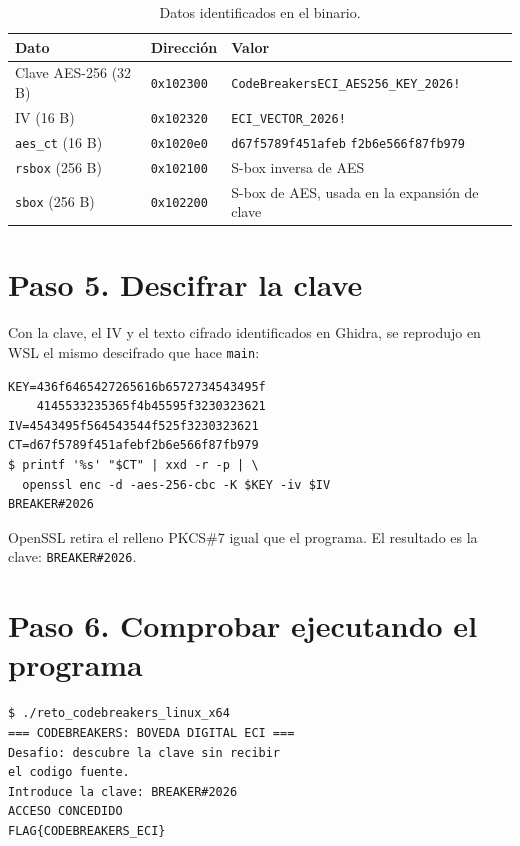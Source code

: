 \documentclass[journal]{IEEEtran}
\begin{document}
\begin{table}[H]
\centering
\caption{Datos identificados en el binario.}
\footnotesize
\begin{tabular}{@{}p{0.85in} l p{1.45in}@{}}
\hline
Dato & Direcci\'on & Valor \\ \hline
Clave AES-256 (32 B) & \texttt{0x102300} & \texttt{CodeBreakersECI\_\allowbreak{}AES256\_\allowbreak{}KEY\_\allowbreak{}2026!} \\
IV (16 B) & \texttt{0x102320} & \texttt{ECI\_\allowbreak{}VECTOR\_\allowbreak{}2026!} \\
\texttt{aes\_\allowbreak{}ct} (16 B) & \texttt{0x1020e0} & \texttt{d67f5789f451afeb} \texttt{f2b6e566f87fb979} \\
\texttt{rsbox} (256 B) & \texttt{0x102100} & S-box inversa de AES \\
\texttt{sbox} (256 B) & \texttt{0x102200} & S-box de AES, usada en la expansi\'on de clave \\ \hline
\end{tabular}
\end{table}

\section{Paso 5. Descifrar la clave}

Con la clave, el IV y el texto cifrado identificados en Ghidra, se reprodujo en
WSL el mismo descifrado que hace \texttt{main}:

{\scriptsize\begin{verbatim}
KEY=436f6465427265616b6572734543495f
    4145533235365f4b45595f3230323621
IV=4543495f564543544f525f3230323621
CT=d67f5789f451afebf2b6e566f87fb979
$ printf '%s' "$CT" | xxd -r -p | \
  openssl enc -d -aes-256-cbc -K $KEY -iv $IV
BREAKER#2026
\end{verbatim}}

OpenSSL retira el relleno PKCS\#7 igual que el programa. El resultado es la
clave: \texttt{BREAKER\#2026}.

\section{Paso 6. Comprobar ejecutando el programa}

{\scriptsize\begin{verbatim}
$ ./reto_codebreakers_linux_x64
=== CODEBREAKERS: BOVEDA DIGITAL ECI ===
Desafio: descubre la clave sin recibir
el codigo fuente.
Introduce la clave: BREAKER#2026
ACCESO CONCEDIDO
FLAG{CODEBREAKERS_ECI}
\end{verbatim}}
\end{document}
